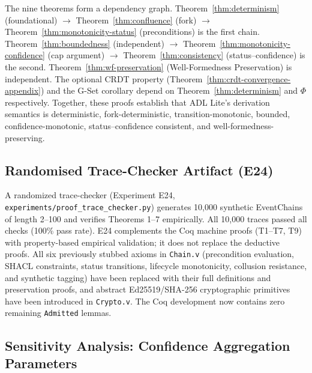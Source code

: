 The nine theorems form a dependency graph. Theorem~\ref{thm:determinism} (foundational) $\to$ Theorem~\ref{thm:confluence} (fork) $\to$ Theorem~\ref{thm:monotonicity-status} (preconditions) is the first chain. Theorem~\ref{thm:boundedness} (independent) $\to$ Theorem~\ref{thm:monotonicity-confidence} (cap argument) $\to$ Theorem~\ref{thm:consistency} (status--confidence) is the second. Theorem~\ref{thm:wf-preservation} (Well-Formedness Preservation) is independent. The optional CRDT property (Theorem~\ref{thm:crdt-convergence-appendix}) and the G-Set corollary depend on Theorem~\ref{thm:determinism} and $\Phi$ respectively. Together, these proofs establish that ADL Lite's derivation semantics is deterministic, fork-deterministic, transition-monotonic, bounded, confidence-monotonic, status--confidence consistent, and well-formedness-preserving.

\subsection{Randomised Trace-Checker Artifact (E24)}
\label{subsec:trace-checker}

A randomized trace-checker (Experiment E24, \texttt{experiments/proof\_trace\_checker.py}) generates 10,000 synthetic EventChains of length 2--100 and verifies Theorems 1--7 empirically. All 10,000 traces passed all checks (100\% pass rate). E24 complements the Coq machine proofs (T1--T7, T9) with property-based empirical validation; it does not replace the deductive proofs. All six previously stubbed axioms in \texttt{Chain.v} (precondition evaluation, SHACL constraints, status transitions, lifecycle monotonicity, collusion resistance, and synthetic tagging) have been replaced with their full definitions and preservation proofs, and abstract Ed25519/SHA-256 cryptographic primitives have been introduced in \texttt{Crypto.v}. The Coq development now contains zero remaining \texttt{Admitted} lemmas.

\subsection{Sensitivity Analysis: Confidence Aggregation Parameters}

